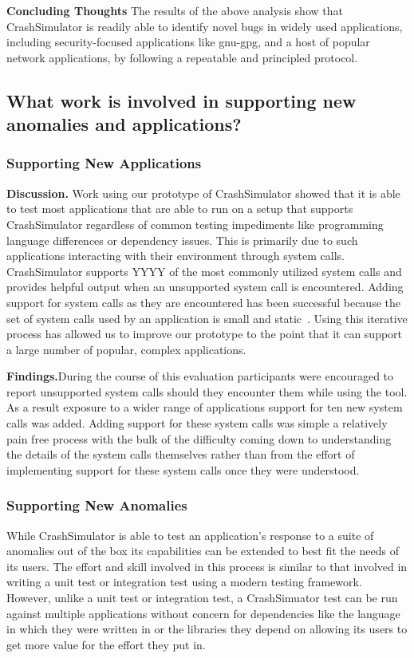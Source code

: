 {\bf Concluding Thoughts} The results of the above analysis show that
CrashSimulator is readily able to identify novel bugs in widely used
applications, including security-focused applications like gnu-gpg, and a host
of popular network applications, by following a repeatable and principled
protocol.


\subsection{What work is involved in supporting new anomalies and
applications?}
\label{sec-new-anom-app}

\subsubsection{Supporting New Applications}
{\bf Discussion.} Work using our prototype of CrashSimulator showed that
it is able to test most
applications that are able to run on a setup that supports CrashSimulator
regardless of common testing impediments like programming language
differences or dependency issues.  This is primarily due to such
applications interacting with their environment through system calls.
CrashSimulator supports YYYY of the most commonly utilized system calls and
provides helpful output when an unsupported system call is encountered.
Adding support for system calls as they are encountered has been successful
because the set of system calls used by an application is small and
static~\cite{Tsai:2016:SML:2901318.2901341}.  Using this iterative process
has allowed us to improve our prototype to the point that it can support a
large number of popular, complex applications.

{\bf Findings.}During the
course of this evaluation participants were encouraged to report
unsupported system calls should they encounter
them while using the tool.  As a result exposure to a wider range of
applications support for ten new system calls was added.  Adding support
for these system calls was simple a relatively pain free process with the
bulk of the difficulty coming down to
understanding the details of the system calls themselves rather than from
the effort of implementing support for these system calls once they were
understood.

\subsubsection{Supporting New Anomalies}

While CrashSimulator is able to test an application's response to a suite
of anomalies out of the box its capabilities can be extended to best fit
the needs of its users.
The effort and skill involved in
this process is similar to that involved in writing a unit test or
integration test using a modern testing framework.  However, unlike a unit
test or integration test, a CrashSimuator test can be run
against multiple
applications without concern for dependencies like the language in which
they were
written in or the libraries they depend on allowing its users to get more
value for the effort they put in.


